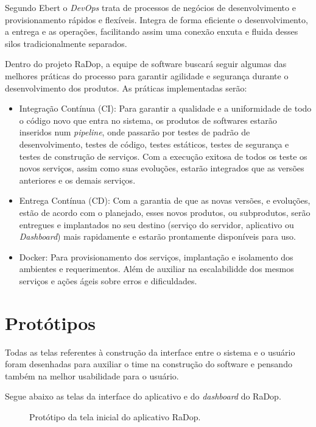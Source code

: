 Segundo Ebert \cite{ebert2016devops} o \textit{DevOps} trata de processos de negócios de desenvolvimento e provisionamento rápidos e flexíveis. Integra de forma eficiente o desenvolvimento, a entrega e as operações, facilitando assim uma conexão enxuta e fluida desses silos tradicionalmente separados.

Dentro do projeto RaDop, a equipe de software buscará seguir algumas das melhores práticas do processo para garantir agilidade e segurança durante o desenvolvimento dos produtos. As práticas implementadas serão:
\begin{itemize}
    \item Integração Contínua (CI): Para garantir a qualidade e a uniformidade de todo o código novo que entra no sistema, os produtos de softwares estarão inseridos num \textit{pipeline}, onde passarão por testes de padrão de desenvolvimento, testes de código, testes estáticos, testes de segurança e testes de construção de serviços. Com a execução exitosa de todos os teste os novos serviços, assim como suas evoluções, estarão integrados que as versões anteriores e os demais serviços.
    \item Entrega Contínua (CD): Com a garantia de que as novas versões, e evoluções, estão de acordo com o planejado, esses novos produtos, ou subprodutos, serão entregues e implantados no seu destino (serviço do servidor, aplicativo ou \textit{Dashboard}) mais rapidamente e estarão prontamente disponíveis para uso.
    \item Docker: Para provisionamento dos serviços, implantação e isolamento dos ambientes e requerimentos. Além de auxiliar na escalabilidde dos mesmos serviços e ações ágeis sobre erros e dificuldades.
\end{itemize}

\section{Protótipos}

Todas as telas referentes à construção da interface entre o sistema e o usuário foram desenhadas para auxiliar o time na construção do software e pensando também na melhor usabilidade para o usuário.

Segue abaixo as telas da interface do aplicativo e do \textit{dashboard} do RaDop.

\begin{figure}[ht]
	\caption{\label{fig:tela_inicial} Protótipo da tela inicial do aplicativo RaDop.}
\end{figure}\newpage

